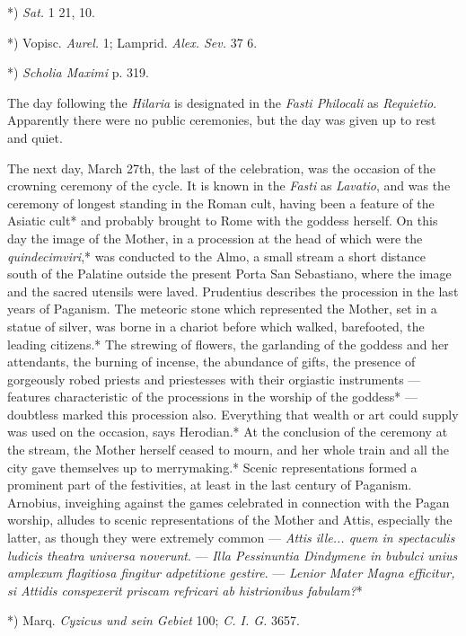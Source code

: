 \documentclass[a4paper, 11pt, oneside, polutonikogreek, english]{article}
\begin{document}
*) \emph{Sat.} 1 21, 10.

*) Vopisc. \emph{Aurel.} 1; Lamprid. \emph{Alex. Sev.} 37 6.

*) \emph{Scholia Maximi} p. 319.

The day following the \emph{Hilaria} is designated in the \emph{Fasti Philocali} as \emph{Requietio}. Apparently there were no public ceremonies, but the day was given up to rest and quiet.

The next day, March 27th, the last of the celebration, was the occasion of the crowning ceremony of the cycle. It is known in the \emph{Fasti} as \emph{Lavatio}, and was the ceremony of longest standing in the Roman cult, having been a feature of the Asiatic cult* and probably brought to Rome with the goddess herself. On this day the image of the Mother, in a procession at the head of which were the \emph{quindecimviri},* was conducted to the Almo, a small stream a short distance south of the Palatine outside the present Porta San Sebastiano, where the image and the sacred utensils were laved. Prudentius describes the procession in the last years of Paganism. The meteoric stone which represented the Mother, set in a statue of silver, was borne in a chariot before which walked, barefooted, the leading citizens.* The strewing of flowers, the garlanding of the goddess and her attendants, the burning of incense, the abundance of gifts, the presence of gorgeously robed priests and priestesses with their orgiastic instruments --- features characteristic of the processions in the worship of the goddess* --- doubtless marked this procession also. Everything that wealth or art could supply was used on the occasion, says Herodian.* At the conclusion of the ceremony at the stream, the Mother herself ceased to mourn, and her whole train and all the city gave themselves up to merrymaking.* Scenic representations formed a prominent part of the festivities, at least in the last century of Paganism. Arnobius, inveighing against the games celebrated in connection with the Pagan worship, alludes to scenic representations of the Mother and Attis, especially the latter, as though they were extremely common --- \emph{Attis ille... quem in spectaculis ludicis theatra universa noverunt}. --- \emph{Illa Pessinuntia Dindymene in bubulci unius amplexum flagitiosa fingitur adpetitione gestire}. --- \emph{Lenior Mater Magna efficitur, si Attidis conspexerit priscam refricari ab histrionibus fabulam?}*

*) Marq. \emph{Cyzicus und sein Gebiet} 100; \emph{C. I. G.} 3657.
\end{document}
